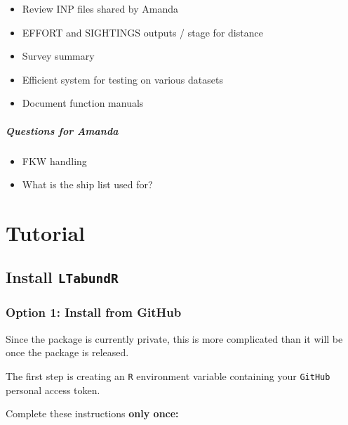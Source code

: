 \documentclass[
]{book}
\begin{document}
\begin{itemize}
\item
  Review INP files shared by Amanda
\item
  EFFORT and SIGHTINGS outputs / stage for distance
\item
  Survey summary
\item
  Efficient system for testing on various datasets
\item
  Document function manuals
\end{itemize}

\hypertarget{questions-for-amanda}{%
\subsubsection*{Questions for Amanda}\label{questions-for-amanda}}

\begin{itemize}
\item
  FKW handling
\item
  What is the ship list used for?
\end{itemize}

\hypertarget{part-tutorial}{%
\part{Tutorial}\label{part-tutorial}}

\hypertarget{install}{%
\chapter{\texorpdfstring{Install \texttt{LTabundR}}{Install LTabundR}}\label{install}}

\hypertarget{option-1-install-from-github}{%
\section*{Option 1: Install from GitHub}\label{option-1-install-from-github}}

Since the package is currently private, this is more complicated than it will be once the package is released.

The first step is creating an \texttt{R} environment variable containing your \texttt{GitHub} personal access token.

Complete these instructions \textbf{only once:}
\end{document}
